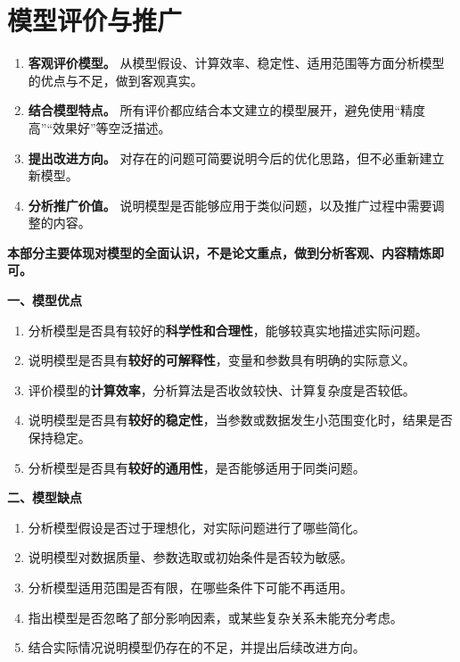 \section{模型评价与推广}
\begin{enumerate}
\item \textbf{客观评价模型。} 从模型假设、计算效率、稳定性、适用范围等方面分析模型的优点与不足，做到客观真实。

\item \textbf{结合模型特点。} 所有评价都应结合本文建立的模型展开，避免使用“精度高”“效果好”等空泛描述。

\item \textbf{提出改进方向。} 对存在的问题可简要说明今后的优化思路，但不必重新建立新模型。

\item \textbf{分析推广价值。} 说明模型是否能够应用于类似问题，以及推广过程中需要调整的内容。
\end{enumerate}
\hspace*{\parindent}\textbf{本部分主要体现对模型的全面认识，不是论文重点，做到分析客观、内容精炼即可。}


\textbf{一、模型优点}

\begin{enumerate}
\item 分析模型是否具有较好的\textbf{科学性和合理性}，能够较真实地描述实际问题。

\item 说明模型是否具有\textbf{较好的可解释性}，变量和参数具有明确的实际意义。

\item 评价模型的\textbf{计算效率}，分析算法是否收敛较快、计算复杂度是否较低。

\item 说明模型是否具有\textbf{较好的稳定性}，当参数或数据发生小范围变化时，结果是否保持稳定。

\item 分析模型是否具有\textbf{较好的通用性}，是否能够适用于同类问题。
\end{enumerate}

\textbf{二、模型缺点}

\begin{enumerate}
\item 分析模型假设是否过于理想化，对实际问题进行了哪些简化。

\item 说明模型对数据质量、参数选取或初始条件是否较为敏感。

\item 分析模型适用范围是否有限，在哪些条件下可能不再适用。

\item 指出模型是否忽略了部分影响因素，或某些复杂关系未能充分考虑。

\item 结合实际情况说明模型仍存在的不足，并提出后续改进方向。
\end{enumerate}

